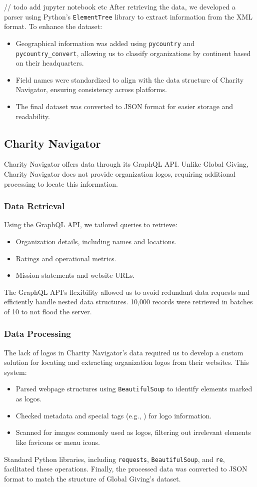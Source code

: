 \documentclass[unicode,9pt,a4paper,oneside,numbers=endperiod,openany]{scrartcl}
\begin{document}
// todo add jupyter notebook etc
After retrieving the data, we developed a parser using Python's \texttt{ElementTree} library to extract information from the XML format. To enhance the dataset:
\begin{itemize}
\item Geographical information was added using \texttt{pycountry} and \texttt{pycountry\_convert}, allowing us to classify organizations by continent based on their headquarters.
\item Field names were standardized to align with the data structure of Charity Navigator, ensuring consistency across platforms.
\item The final dataset was converted to JSON format for easier storage and readability.
\end{itemize}

\subsection{Charity Navigator}
Charity Navigator offers data through its GraphQL API. Unlike Global Giving, Charity Navigator does not provide organization logos, requiring additional processing to locate this information.

\subsubsection{Data Retrieval}
Using the GraphQL API, we tailored queries to retrieve:
\begin{itemize}
\item Organization details, including names and locations.
\item Ratings and operational metrics.
\item Mission statements and website URLs.
\end{itemize}
The GraphQL API's flexibility allowed us to avoid redundant data requests and efficiently handle nested data structures. 10,000 records were retrieved in batches of 10 to not flood the server.

\subsubsection{Data Processing}
The lack of logos in Charity Navigator's data required us to develop a custom solution for locating and extracting organization logos from their websites. This system:
\begin{itemize}
\item Parsed webpage structures using \texttt{BeautifulSoup} to identify elements marked as logos.
\item Checked metadata and special tags (e.g., \texttt{}) for logo information.
\item Scanned for images commonly used as logos, filtering out irrelevant elements like favicons or menu icons.
\end{itemize}
Standard Python libraries, including \texttt{requests}, \texttt{BeautifulSoup}, and \texttt{re}, facilitated these operations. Finally, the processed data was converted to JSON format to match the structure of Global Giving's dataset.
\end{document}
